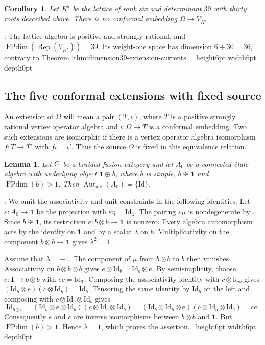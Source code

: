 \documentclass[leqno]{article}
\let\cal\relax
\newcommand{\cal}{\mathcal}
\newcommand{\Id}{\mathrm{Id}}
\newcommand{\qed}{\hfill \vrule height6pt  width6pt depth0pt}
\newcommand{\co}{\colon}
\newcommand{\ot}{\otimes}
\newcommand{\epsi}{\varepsilon}
\DeclareMathOperator{\Rep}{Rep}
\newtheorem{cor}[thm]{Corollary}
\newtheorem{lemma}[thm]{Lemma}
\newenvironment{proof}[1][]{\noindent {\it Proof #1} : }{\hbox{~}\qed
\smallskip
}
\numberwithin{equation}{section}
\begin{document}
\begin{cor}
\label{cor:no-Kflat-embedding}
Let $K^\flat$ be the lattice of rank six and determinant $39$ with thirty roots described above. There is no conformal embedding $\Omega \to V_{K^\flat}$.
\end{cor}

\begin{proof}
The lattice algebra is positive and strongly rational, and $\operatorname{FPdim}(\Rep(V_{K^\flat})) = 39$. Its weight-one space has dimension $6+30 = 36$, contrary to Theorem \ref{thm:dimension39-extension-currents}.
\end{proof}

\subsection{The five conformal extensions with fixed source}
\label{subsec:five-fixed-source-extensions}

An extension of $\Omega$ will mean a pair $(T,\iota)$, where $T$ is a positive strongly rational vertex operator algebra and $\iota \co \Omega \to T$ is a conformal embedding. Two such extensions are isomorphic if there is a vertex operator algebra isomorphism $f \co T \to T'$ with $f\iota = \iota'$. Thus the source $\Omega$ is fixed in this equivalence relation.

\begin{lemma}
\label{lem:rank-two-etale-automorphisms}
Let $\cal C$ be a braided fusion category and let $A_0$ be a connected \'etale algebra with underlying object $\mathbf1\oplus b$, where $b$ is simple, $b \not \cong \mathbf1$ and $\operatorname{FPdim}(b) > 1$. Then $\operatorname{Aut}_{\mathrm{alg}}(A_0) = \{\Id\}$.
\end{lemma}

\begin{proof}
We omit the associativity and unit constraints in the following identities. Let $\epsi \co A_0 \to \mathbf1$ be the projection with $\epsi\eta = \Id_{\mathbf1}$. The pairing $\epsi\mu$ is nondegenerate by \cite[Remark 3.4 p.~7]{DMNO13}. Since $b \not \cong \mathbf1$, its restriction $e \co b\ot b \to \mathbf1$ is nonzero. Every algebra automorphism acts by the identity on $\mathbf1$ and by a scalar $\lambda$ on $b$. Multiplicativity on the component $b\ot b \to \mathbf1$ gives $\lambda^2 = 1$.

Assume that $\lambda = -1$. The component of $\mu$ from $b\ot b$ to $b$ then vanishes. Associativity on $b\ot b\ot b$ gives $e\ot\Id_b = \Id_b\ot e$. By semisimplicity, choose $c \co \mathbf1 \to b\ot b$ with $ec = \Id_{\mathbf1}$. Composing the associativity identity with $c\ot\Id_b$ gives $(\Id_b\ot e)(c\ot\Id_b) = \Id_b$. Tensoring the same identity by $\Id_b$ on the left and composing with $c\ot\Id_b\ot\Id_b$ gives
\[
\Id_{b\ot b}
= (\Id_b\ot e\ot\Id_b)(c\ot\Id_b\ot\Id_b)
= (\Id_b\ot\Id_b\ot e)(c\ot\Id_b\ot\Id_b)
= ce.
\]
Consequently $e$ and $c$ are inverse isomorphisms between $b\ot b$ and $\mathbf1$. But $\operatorname{FPdim}(b) > 1$. Hence $\lambda = 1$, which proves the assertion.
\end{proof}
\end{document}
